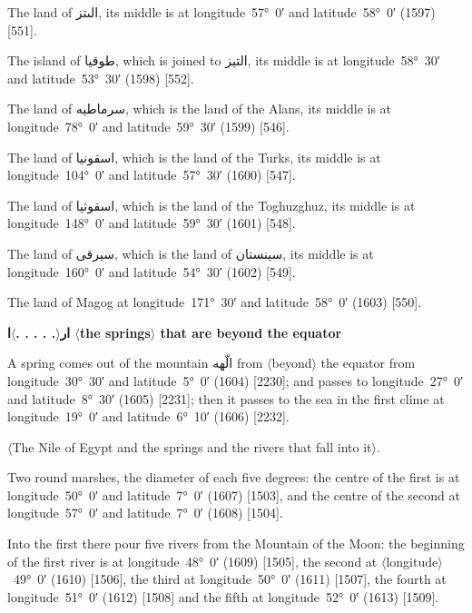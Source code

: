 \documentclass[11pt]{article}
\newcommand{\Pg}[1]{\marginpar{\footnotesize #1}}
\newcommand{\Ang}[1]{\ensuremath{#1}}
\newcommand{\AngOpen}{\ensuremath{\rangle}}
\newcommand{\AngClose}{\ensuremath{\langle}}
\begin{document}
The land of \textarabic{الٮتز}, its middle is at longitude~57°~0′ and latitude~58°~0′ (1597) [551].

The island of \textarabic{طوقيا}, which is joined to \textarabic{التيز}, its middle is at longitude~58°~30′ and latitude~53°~30′ (1598) [552].

The land of \textarabic{سرماطيه}, which is the land of the Alans, its middle is at longitude~78°~0′ and latitude~59°~30′ (1599) [546].

The land of \textarabic{اسقونيا}, which is the land of the Turks, its middle is at longitude~104°~0′ and latitude~57°~30′ (1600) [547].

The land of \textarabic{اسقوثيا}, which is the land of the Toghuzghuz, its middle is at longitude~148°~0′ and latitude~59°~30′ (1601) [548].

The land of \textarabic{سيرقى}, which is the land of \textarabic{سينستان}, its middle is at longitude~160°~0′ and latitude~54°~30′ (1602) [549].

The land of Magog at longitude~171°~30′ and latitude~58°~0′ (1603) [550].

\par\medskip\begin{center}\Pg{p. 106}\bfseries \textarabic{ار\AngOpen{}. . . . .\AngClose{}ا} \Ang{\langle}the springs\Ang{\rangle} that are beyond the equator\end{center}\par

A spring comes out of the mountain \textarabic{الّهه} from \Ang{\langle}beyond\Ang{\rangle} the equator from longitude~30°~30′ and latitude~5°~0′ (1604) [2230]; and passes to longitude~27°~0′ and latitude~8°~30′ (1605) [2231]; then it passes to the sea in the first clime at longitude~19°~0′ and latitude~6°~10′ (1606) [2232].

\Ang{\langle}The Nile of Egypt and the springs and the rivers that fall into it\Ang{\rangle}.

Two round marshes, the diameter of each five degrees: the centre of the first is at longitude~50°~0′ and latitude~7°~0′ (1607) [1503], and the centre of the second at longitude~57°~0′ and latitude~7°~0′ (1608) [1504].

Into the first there pour five rivers from the Mountain of the Moon: the beginning of the first river is at longitude~48°~0′ (1609) [1505], the second at \Ang{\langle}longitude\Ang{\rangle}~49°~0′ (1610) [1506], the third at longitude~50°~0′ (1611) [1507], the fourth at longitude~51°~0′ (1612) [1508] and the fifth at longitude~52°~0′ (1613) [1509].
\end{document}
